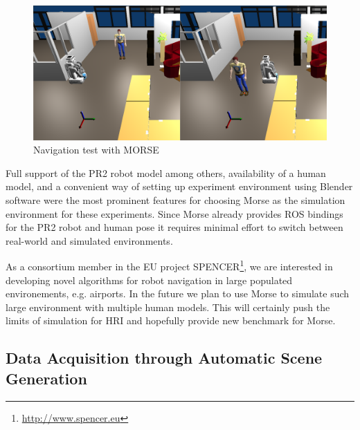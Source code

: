 \documentclass[conference]{IEEEtran}
\begin{document}
\begin{figure}[H]
      \centering
      \includegraphics[width=0.9\linewidth]{morsehanp.png}
      \caption{Navigation test with MORSE}
      \label{fig|hanp}
\end{figure}

Full support of the PR2 robot model among others, availability of a human model,
and a convenient way of setting up experiment environment using Blender software
were the most prominent features for choosing Morse as the simulation
environment for these experiments. Since Morse already provides ROS bindings for
the PR2 robot and human pose it requires minimal effort to switch between
real-world and simulated environments.

As a consortium member in the EU project
SPENCER\footnote{\url{http://www.spencer.eu}}, we are interested in developing
novel algorithms for robot navigation in large populated environements,
e.g. airports. In the future we plan to use Morse to simulate such large
environment with multiple human models. This will certainly push the limits of
simulation for HRI and hopefully provide new benchmark for Morse.


\subsection{Data Acquisition through Automatic Scene Generation}
\label{sc:generation}
\end{document}
